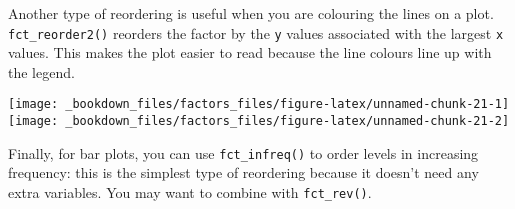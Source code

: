 \documentclass[]{book}
\newenvironment{Shaded}{\begin{snugshade}}{\end{snugshade}}
\newcommand{\KeywordTok}[1]{\textcolor[rgb]{0.13,0.29,0.53}{\textbf{{#1}}}}
\newcommand{\DataTypeTok}[1]{\textcolor[rgb]{0.13,0.29,0.53}{{#1}}}
\newcommand{\StringTok}[1]{\textcolor[rgb]{0.31,0.60,0.02}{{#1}}}
\newcommand{\OtherTok}[1]{\textcolor[rgb]{0.56,0.35,0.01}{{#1}}}
\newcommand{\NormalTok}[1]{{#1}}
\begin{document}
Another type of reordering is useful when you are colouring the lines on
a plot. \texttt{fct\_reorder2()} reorders the factor by the \texttt{y}
values associated with the largest \texttt{x} values. This makes the
plot easier to read because the line colours line up with the legend.

\begin{Shaded}
\end{Shaded}

\texttt{[image: \_bookdown\_files/factors\_files/figure-latex/unnamed-chunk-21-1]}
\texttt{[image: \_bookdown\_files/factors\_files/figure-latex/unnamed-chunk-21-2]}

Finally, for bar plots, you can use \texttt{fct\_infreq()} to order
levels in increasing frequency: this is the simplest type of reordering
because it doesn't need any extra variables. You may want to combine
with \texttt{fct\_rev()}.

\begin{Shaded}
\end{Shaded}
\end{document}
